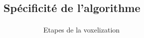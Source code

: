 \subsection{Spécificité de l'algorithme}

\begin{frame}[fragile=singleslide]{\insertsectionhead}
  \framesubtitle{\insertsubsectionhead}
  \begin{figure}[ht!]
    \begin{subfigure}{0.6\textwidth}
      \caption*{Etapes de la voxelization}
    \end{subfigure}
    \hspace{1.2cm}
    \begin{subfigure}{0.225\textwidth}

\end{subfigure}
\end{figure}
\end{frame}
